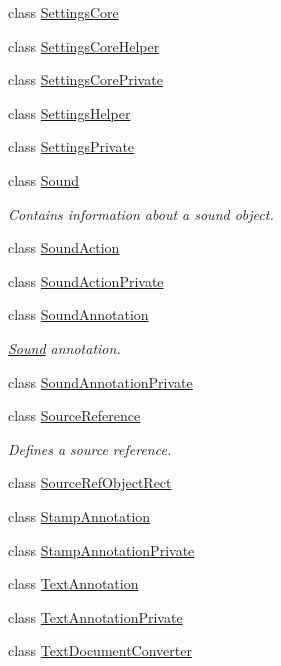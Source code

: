 \begin{DoxyCompactItemize}
\item 
class \hyperlink{classOkular_1_1SettingsCore}{Settings\+Core}
\item 
class \hyperlink{classOkular_1_1SettingsCoreHelper}{Settings\+Core\+Helper}
\item 
class \hyperlink{classOkular_1_1SettingsCorePrivate}{Settings\+Core\+Private}
\item 
class \hyperlink{classOkular_1_1SettingsHelper}{Settings\+Helper}
\item 
class \hyperlink{classOkular_1_1SettingsPrivate}{Settings\+Private}
\item 
class \hyperlink{classOkular_1_1Sound}{Sound}
\begin{DoxyCompactList}\small\item\em Contains information about a sound object. \end{DoxyCompactList}\item 
class \hyperlink{classOkular_1_1SoundAction}{Sound\+Action}
\item 
class \hyperlink{classOkular_1_1SoundActionPrivate}{Sound\+Action\+Private}
\item 
class \hyperlink{classOkular_1_1SoundAnnotation}{Sound\+Annotation}
\begin{DoxyCompactList}\small\item\em \hyperlink{classOkular_1_1Sound}{Sound} annotation. \end{DoxyCompactList}\item 
class \hyperlink{classOkular_1_1SoundAnnotationPrivate}{Sound\+Annotation\+Private}
\item 
class \hyperlink{classOkular_1_1SourceReference}{Source\+Reference}
\begin{DoxyCompactList}\small\item\em Defines a source reference. \end{DoxyCompactList}\item 
class \hyperlink{classOkular_1_1SourceRefObjectRect}{Source\+Ref\+Object\+Rect}
\item 
class \hyperlink{classOkular_1_1StampAnnotation}{Stamp\+Annotation}
\item 
class \hyperlink{classOkular_1_1StampAnnotationPrivate}{Stamp\+Annotation\+Private}
\item 
class \hyperlink{classOkular_1_1TextAnnotation}{Text\+Annotation}
\item 
class \hyperlink{classOkular_1_1TextAnnotationPrivate}{Text\+Annotation\+Private}
\item 
class \hyperlink{classOkular_1_1TextDocumentConverter}{Text\+Document\+Converter}

\end{DoxyCompactItemize}
